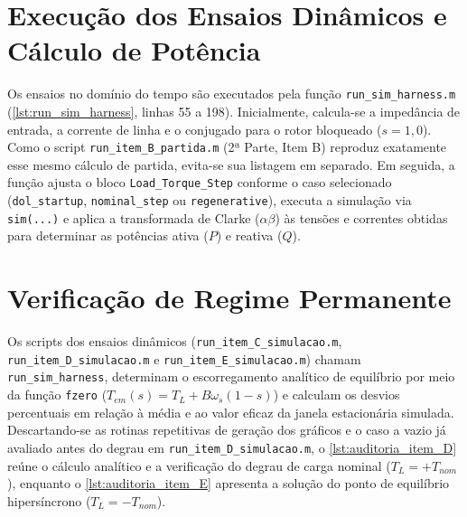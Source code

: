 \section{Execução dos Ensaios Dinâmicos e Cálculo de Potência}\label{sec:codigo_harness}

Os ensaios no domínio do tempo são executados pela função \texttt{run\_\allowbreak{}sim\_\allowbreak{}harness.m} (\cref{lst:run_sim_harness}, linhas 55 a 198). Inicialmente, calcula-se a impedância de entrada, a corrente de linha e o conjugado para o rotor bloqueado ($s = 1{,}0$). Como o script \texttt{run\_\allowbreak{}item\_\allowbreak{}B\_\allowbreak{}partida.m} (2ª Parte, Item B) reproduz exatamente esse mesmo cálculo de partida, evita-se sua listagem em separado. Em seguida, a função ajusta o bloco \texttt{Load\_Torque\_Step} conforme o caso selecionado (\texttt{dol\_startup}, \texttt{nominal\_step} ou \texttt{regenerative}), executa a simulação via \texttt{sim(...)} e aplica a transformada de Clarke ($\alpha\beta$) às tensões e correntes obtidas para determinar as potências ativa ($P$) e reativa ($Q$).



\section{Verificação de Regime Permanente}\label{sec:codigo_auditoria_sintese}

Os scripts dos ensaios dinâmicos (\texttt{run\_item\_C\_simulacao.m}, \texttt{run\_item\_D\_simulacao.m} e \texttt{run\_item\_E\_simulacao.m}) chamam \texttt{run\_sim\_harness}, determinam o escorregamento analítico de equilíbrio por meio da função \texttt{fzero} ($T_{em}(s) = T_L + B\omega_s(1-s)$) e calculam os desvios percentuais em relação à média e ao valor eficaz da janela estacionária simulada. Descartando-se as rotinas repetitivas de geração dos gráficos e o caso a vazio já avaliado antes do degrau em \texttt{run\_item\_D\_simulacao.m}, o \cref{lst:auditoria_item_D} reúne o cálculo analítico e a verificação do degrau de carga nominal ($T_L = +T_{nom}$), enquanto o \cref{lst:auditoria_item_E} apresenta a solução do ponto de equilíbrio hipersíncrono ($T_L = -T_{nom}$).

